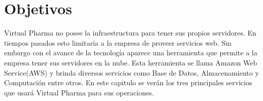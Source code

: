 \section*{Objetivos}\label{sec:Objetivos}
Virtual Pharma no posee la infraestructura para tener sus propios servidores. En tiempos pasados esto limitaría a la empresa de proveer servicios web. Sin embargo con el avance de la tecnología aparece una herramienta que permite a la empresa tener sus servidores en la nube. Esta herramienta se llama Amazon Web Service(AWS) y brinda diversos servicios como Base de Datos, Almacenamiento y Computación entre otros. En este capitulo se verán los tres principales servicios que usará Virtual Pharma para sus operaciones.